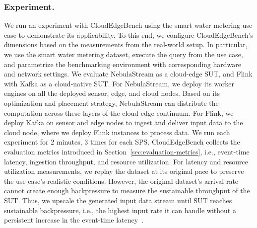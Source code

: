 \documentclass[runningheads]{llncs}
\begin{document}
\subsubsection{Experiment.}
We run an experiment with CloudEdgeBench using the smart water metering use case to demonstrate its applicability.
To this end, we configure CloudEdgeBench's dimensions based on the measurements from the real-world setup.
In particular, we use the smart water metering dataset, execute the query from the use case, and parametrize the benchmarking environment with corresponding hardware and network settings.
%
We evaluate NebulaStream as a cloud-edge SUT, and Flink with Kafka as a cloud-native SUT. %
For NebulaStream, we deploy its worker engines on all the deployed sensor, edge, and cloud nodes.
Based on its optimization and placement strategy, NebulaStream can distribute the computation across these layers of the cloud-edge continuum.
For Flink, we deploy Kafka on sensor and edge nodes to ingest and deliver input data to the cloud node, where we deploy Flink instances to process data. 
%
We run each experiment for 2 minutes, 3 times for each SPS. 
CloudEdgeBench collects the evaluation metrics introduced in Section~\ref{sec:evaluation-metrics}, i.e., event-time latency, ingestion throughput, and resource utilization. 
For latency and resource utilization measurements, we replay the dataset at its original pace to preserve the use case's realistic conditions. 
However, the original dataset's arrival rate cannot create enough backpressure to measure the sustainable throughput of the SUT. 
Thus, we upscale the generated input data stream until SUT reaches sustainable backpressure, i.e., the highest input rate it can handle without a persistent increase in the event-time latency~\cite{karimov2018}. 
\end{document}
